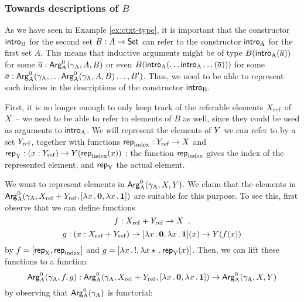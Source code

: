 \documentclass{article}
\begin{document}
\subsubsection{Towards descriptions of $B$} %
\label{sec:towards-SPB}

As we have seen in Example \ref{ex:ctxt-type}, it is important that
the constructor $\mathsf{intro}_{\mathrm{B}}$ for the second set $B : A \to \mathsf{Set}$ can
refer to the constructor $\mathsf{intro}_{\mathrm{A}}$ for the first set $A$. This means
that inductive arguments might be of type $B(\mathsf{intro}_{\mathrm{A}}(\overline{a}))$
for some $\overline{a} : \mathsf{Arg}^{0}_{\mathrm{A}}(\gamma_{\mathrm{A}}, A, B)$ or even
$B(\mathsf{intro}_{\mathrm{A}}(\ldots\mathsf{intro}_{\mathrm{A}}\ldots(\overline{a})))$ for some $\overline{a}
: \mathsf{Arg}^{0}_{\mathrm{A}}(\gamma_{\mathrm{A}}, \ldots \mathsf{Arg}^{0}_{\mathrm{A}}(\gamma_{\mathrm{A}}, A, B)\ldots, B')$. Thus, we
need to be able to represent such indices in the descriptions of the
constructor $\mathsf{intro}_{\mathrm{B}}$.

First, it is no longer enough to only keep track of the referable
elements $X_{\mathrm{ref}}$ of $X$ -- we need to be able to refer to elements of
$B$ as well, since they could be used as arguments to $\mathsf{intro}_{\mathrm{A}}$. We
will represent the elements of $Y$ we can refer to by a set $Y_{\mathrm{ref}}$,
together with functions $\mathsf{rep}_{\mathrm{index}} : Y_{\mathrm{ref}} \to X$ and $\mathsf{rep}_{\mathrm{Y}} : (x :
Y_{\mathrm{ref}}) \to Y(\mathsf{rep}_{\mathrm{index}}(x))$ ; the function $\mathsf{rep}_{\mathrm{index}}$ gives the index
of the represented element, and $\mathsf{rep}_{\mathrm{Y}}$ the actual element.

We want to represent elements in $\mathsf{Arg}^{0}_{\mathrm{A}}(\gamma_{\mathrm{A}}, X, Y)$. We claim that
the elements in $\mathsf{Arg}^{0}_{\mathrm{A}}(\gamma_{\mathrm{A}}, X_{\mathrm{ref}} + Y_{\mathrm{ref}}, [\lambda x\,.\,\mathbf{0},
\lambda x\,.\,\mathbf{1}])$ are suitable for this purpose. To see this,
first observe that we can define functions
\[
f : X_{\mathrm{ref}} + Y_{\mathrm{ref}} \to X \enspace ,
\]
%
%
\[
g : (x : X_{\mathrm{ref}} + Y_{\mathrm{ref}}) \to
    [\lambda x\,.\,\mathbf{0}, \lambda x\,.\,\mathbf{1}](x)
      \to Y(f(x))
\]
%
by $f = [\mathsf{rep}_{\mathrm{X}}, \mathsf{rep}_{\mathrm{index}}]$ and $g = [\lambda x\,.\,!, \lambda x \star\,.\, \mathsf{rep}_{\mathrm{Y}}(x)]$. Then, we can lift these
functions to a function
%
\[
\mathsf{Arg}^{0}_{\mathrm{A}}(\gamma_{\mathrm{A}}, f, g) : \mathsf{Arg}^{0}_{\mathrm{A}}(\gamma_{\mathrm{A}}, X_{\mathrm{ref}} +Y_{\mathrm{ref}}, [\lambda x\,.\,\mathbf{0}, \lambda x\,.\,\mathbf{1}]) \to
                       \mathsf{Arg}^{0}_{\mathrm{A}}(\gamma_{\mathrm{A}}, X, Y)
\]
%
by observing that $\mathsf{Arg}^{0}_{\mathrm{A}}(\gamma_{\mathrm{A}})$ is functorial:
\end{document}
